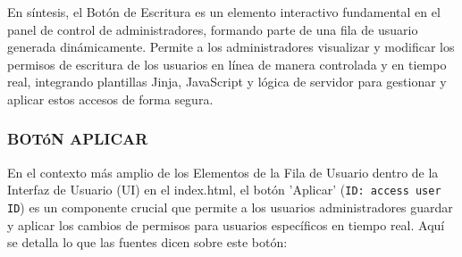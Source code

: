 \documentclass{report}
\begin{document}
En síntesis, el Botón de Escritura es un elemento interactivo fundamental en el panel de control de administradores, formando parte de 
una fila de usuario generada dinámicamente. Permite a los administradores visualizar y modificar los permisos de escritura de los usuarios 
en línea de manera controlada y en tiempo real, integrando plantillas Jinja, JavaScript y lógica de servidor para gestionar y aplicar estos 
accesos de forma segura.

\subsubsection{BOTóN APLICAR}
En el contexto más amplio de los Elementos de la Fila de Usuario dentro de la Interfaz de Usuario (UI) en el index.html, el botón 'Aplicar' 
(\verb|ID: access user ID|) es un componente crucial que permite a los usuarios administradores guardar y aplicar los cambios de permisos 
para usuarios específicos en tiempo real.
Aquí se detalla lo que las fuentes dicen sobre este botón:
\end{document}
